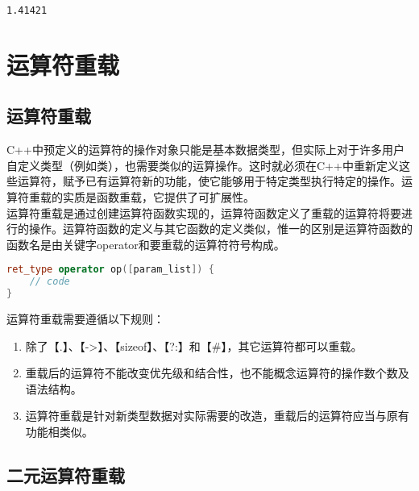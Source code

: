 \begin{tcolorbox}
	\begin{verbatim}
1.41421
	\end{verbatim}
\end{tcolorbox}

\newpage

\section{运算符重载}

\subsection{运算符重载}

C++中预定义的运算符的操作对象只能是基本数据类型，但实际上对于许多用户自定义类型（例如类），也需要类似的运算操作。这时就必须在C++中重新定义这些运算符，赋予已有运算符新的功能，使它能够用于特定类型执行特定的操作。运算符重载的实质是函数重载，它提供了可扩展性。\\

运算符重载是通过创建运算符函数实现的，运算符函数定义了重载的运算符将要进行的操作。运算符函数的定义与其它函数的定义类似，惟一的区别是运算符函数的函数名是由关键字operator和要重载的运算符符号构成。

\vspace{-0.5cm}

\begin{lstlisting}[language=C++]
ret_type operator op([param_list]) {
    // code
}
\end{lstlisting}

运算符重载需要遵循以下规则：

\begin{enumerate}
	\item 除了【.】、【->】、【sizeof】、【?:】和【\#】，其它运算符都可以重载。

	\item 重载后的运算符不能改变优先级和结合性，也不能概念运算符的操作数个数及语法结构。

	\item 运算符重载是针对新类型数据对实际需要的改造，重载后的运算符应当与原有功能相类似。
\end{enumerate}

\vspace{0.5cm}

\subsection{二元运算符重载}

